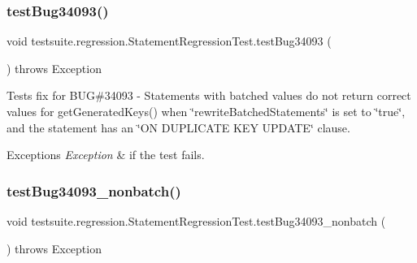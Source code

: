 \subsubsection{\texorpdfstring{test\+Bug34093()}{testBug34093()}}
{\footnotesize\ttfamily void testsuite.\+regression.\+Statement\+Regression\+Test.\+test\+Bug34093 (\begin{DoxyParamCaption}{ }\end{DoxyParamCaption}) throws Exception}

Tests fix for B\+UG\#34093 -\/ Statements with batched values do not return correct values for get\+Generated\+Keys() when \char`\"{}rewrite\+Batched\+Statements\char`\"{} is set to \char`\"{}true\char`\"{}, and the statement has an \char`\"{}\+O\+N D\+U\+P\+L\+I\+C\+A\+T\+E K\+E\+Y U\+P\+D\+A\+T\+E\char`\"{} clause.


\begin{DoxyExceptions}{Exceptions}
{\em Exception} & if the test fails. \\
\hline
\end{DoxyExceptions}
\mbox{\label{classtestsuite_1_1regression_1_1_statement_regression_test_a4da5d0486fdf95888cc7b48416651a78}} 
\subsubsection{\texorpdfstring{test\+Bug34093\+\_\+nonbatch()}{testBug34093\_nonbatch()}}
{\footnotesize\ttfamily void testsuite.\+regression.\+Statement\+Regression\+Test.\+test\+Bug34093\+\_\+nonbatch (\begin{DoxyParamCaption}{ }\end{DoxyParamCaption}) throws Exception}

\mbox{\label{classtestsuite_1_1regression_1_1_statement_regression_test_a15c0e8d8655abcb27daec70120313cc5}} 

